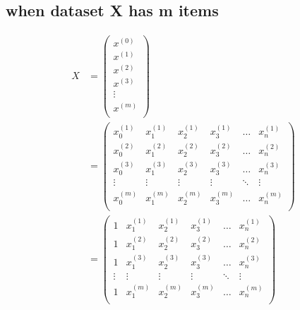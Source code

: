 \subsection{when dataset X has m items}
\begin{equation}
\begin{aligned}
X & = \left(\begin{matrix}
		x^{(0)} \\ x^{(1)} \\ x^{(2)} \\ x^{(3)} \\ \vdots \\ x^{(m)} \\
	\end{matrix}\right) \\
& = \left( \begin{matrix}
		x_0^{(1)} & x_1^{(1)} & x_2^{(1)} & x_3^{(1)} & \dots & x_n^{(1)} \\
		x_0^{(2)} & x_1^{(2)} & x_2^{(2)} & x_3^{(2)} & \dots & x_n^{(2)} \\
		x_0^{(3)} & x_1^{(3)} & x_2^{(3)} & x_3^{(3)} & \dots & x_n^{(3)} \\
		\vdots    & \vdots    & \vdots    & \vdots    & \ddots & \vdots   \\
		x_0^{(m)} & x_1^{(m)} & x_2^{(m)} & x_3^{(m)} & \dots & x_n^{(m)} \\
		\end{matrix}\right) \\
& = \left(\begin{matrix}
		1 & x_1^{(1)} & x_2^{(1)} & x_3^{(1)} & \dots & x_n^{(1)} \\
		1 & x_1^{(2)} & x_2^{(2)} & x_3^{(2)} & \dots & x_n^{(2)} \\
		1 & x_1^{(3)} & x_2^{(3)} & x_3^{(3)} & \dots & x_n^{(3)} \\
		\vdots    & \vdots    & \vdots    & \vdots    & \ddots & \vdots   \\
		1 & x_1^{(m)} & x_2^{(m)} & x_3^{(m)} & \dots & x_n^{(m)} \\
	\end{matrix}\right)
\end{aligned}
\end{equation}


